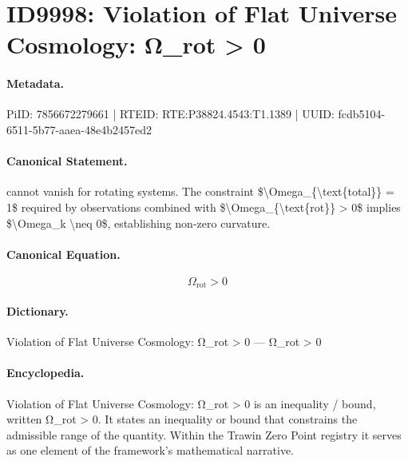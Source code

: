 \section*{ID9998: Violation of Flat Universe Cosmology: Ω\_rot > 0}
\paragraph{Metadata.}
PiID: 7856672279661 | RTEID: RTE:P38824.4543:T1.1389 | UUID: fcdb5104-6511-5b77-aaea-48e4b2457ed2

\paragraph{Canonical Statement.}
cannot vanish for rotating systems. The constraint \$\textbackslash{}Omega\_\{\textbackslash{}text\{total\}\} = 1\$ required by observations combined with \$\textbackslash{}Omega\_\{\textbackslash{}text\{rot\}\} > 0\$ implies \$\textbackslash{}Omega\_k \textbackslash{}neq 0\$, establishing non-zero curvature.

\paragraph{Canonical Equation.}
\[
\Omega_{\text{rot}} > 0
\]

\paragraph{Dictionary.}
Violation of Flat Universe Cosmology: Ω\_rot > 0 — Ω\_rot > 0

\paragraph{Encyclopedia.}
Violation of Flat Universe Cosmology: Ω\_rot > 0 is an inequality / bound, written Ω\_rot > 0. It states an inequality or bound that constrains the admissible range of the quantity. Within the Trawin Zero Point registry it serves as one element of the framework's mathematical narrative.
